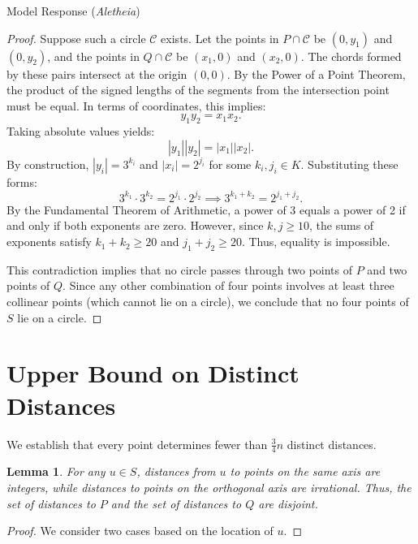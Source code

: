 \documentclass[11pt]{article}
\newtheorem{lemma}{Lemma}
\begin{document}
\begin{solution}{Model Response (\emph{Aletheia})}
\begin{proof}
Suppose such a circle $\mathcal{C}$ exists. Let the points in $P \cap \mathcal{C}$ be $(0, y_1)$ and $(0, y_2)$, and the points in $Q \cap \mathcal{C}$ be $(x_1, 0)$ and $(x_2, 0)$.
The chords formed by these pairs intersect at the origin $(0,0)$. By the Power of a Point Theorem, the product of the signed lengths of the segments from the intersection point must be equal. In terms of coordinates, this implies:
\[
y_1 y_2 = x_1 x_2.
\]
Taking absolute values yields:
\[
|y_1| |y_2| = |x_1| |x_2|.
\]
By construction, $|y_i| = 3^{k_i}$ and $|x_i| = 2^{j_i}$ for some $k_i, j_i \in K$. Substituting these forms:
\[
3^{k_1} \cdot 3^{k_2} = 2^{j_1} \cdot 2^{j_2} \implies 3^{k_1 + k_2} = 2^{j_1 + j_2}.
\]
By the Fundamental Theorem of Arithmetic, a power of 3 equals a power of 2 if and only if both exponents are zero. However, since $k, j \ge 10$, the sums of exponents satisfy $k_1+k_2 \ge 20$ and $j_1+j_2 \ge 20$. Thus, equality is impossible.

This contradiction implies that no circle passes through two points of $P$ and two points of $Q$. Since any other combination of four points involves at least three collinear points (which cannot lie on a circle), we conclude that no four points of $S$ lie on a circle.
\end{proof}

\section{Upper Bound on Distinct Distances}

We establish that every point determines fewer than $\frac{3}{4}n$ distinct distances.

\begin{lemma}
For any $u \in S$, distances from $u$ to points on the same axis are integers, while distances to points on the orthogonal axis are irrational. Thus, the set of distances to $P$ and the set of distances to $Q$ are disjoint.
\end{lemma}

\begin{proof}
We consider two cases based on the location of $u$.


\end{proof}
\end{solution}
\end{document}
